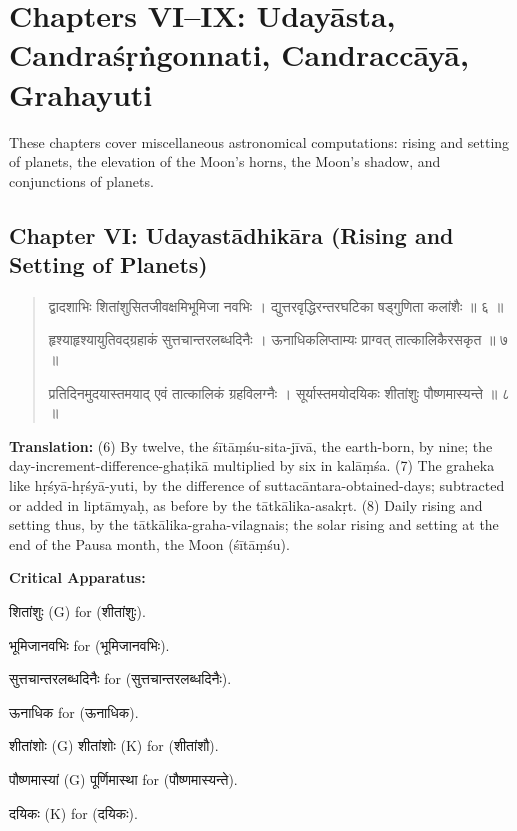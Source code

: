 \documentclass[11pt,a4paper]{article}
\newcommand{\dev}[1]{{\devanagarifont #1}}
\newenvironment{sanskritverse}{%
  \begin{quote}%
  \devanagarifont%
  \setlength{\leftmargin}{2em}%
}{\end{quote}}
\newenvironment{variants}{%
  \small%
  \color{varecolor}%
  \list{}{\leftmargin=2em\itemindent=-1em}%
}{\endlist}
\begin{document}
\newpage


\section*{Chapters VI--IX: Udayāsta, Candraśṛṅgonnati, Candraccāyā, Grahayuti}

These chapters cover miscellaneous astronomical computations: rising and setting 
of planets, the elevation of the Moon's horns, the Moon's shadow, and conjunctions 
of planets.

\subsection*{Chapter VI: Udayastādhikāra (Rising and Setting of Planets)}

\begin{sanskritverse}
\dev{द्वादशाभिः शितांशुसितजीवक्षमिभूमिजा नवभिः} ।
\dev{द्युत्तरवृद्धिरन्तरघटिका षड्गुणिता कलांशैः ॥ ६ ॥}

\dev{हृश्याहृश्यायुतिवद्ग्रहाकं सुत्तचान्तरलब्धदिनैः} ।
\dev{ऊनाधिकलिप्ताम्यः प्राग्वत् तात्कालिकैरसकृत ॥ ७ ॥}

\dev{प्रतिदिनमुदयास्तमयाद् एवं तात्कालिकं ग्रहविलग्नैः} ।
\dev{सूर्यास्तमयोदयिकः शीतांशुः पौष्णमास्यन्ते ॥ ८ ॥}
\end{sanskritverse}

\textbf{Translation:} (6) By twelve, the śītāṃśu-sita-jīvā, the earth-born, by 
nine; the day-increment-difference-ghaṭikā multiplied by six in kalāṃśa. (7) The 
graheka like hṛśyā-hṛśyā-yuti, by the difference of suttacāntara-obtained-days; 
subtracted or added in liptāmyaḥ, as before by the tātkālika-asakṛt. (8) Daily 
rising and setting thus, by the tātkālika-graha-vilagnais; the solar rising and 
setting at the end of the Pausa month, the Moon (śītāṃśu).

\textcolor{varecolor}{\textbf{Critical Apparatus:}}
\begin{variants}
\item[6.1] \dev{शितांशुः} (G) \dev{for} (\dev{शीतांशुः}).
\item[6.2] \dev{भूमिजानवभिः} \dev{for} (\dev{भूमिजानवभिः}).
\item[7.1] \dev{सुत्तचान्तरलब्धदिनैः} \dev{for} (\dev{सुत्तचान्तरलब्धदिनैः}).
\item[7.2] \dev{ऊनाधिक} \dev{for} (\dev{ऊनाधिक}).
\item[8.1] \dev{शीतांशोः} (G) \dev{शीतांशोः} (K) \dev{for} (\dev{शीतांशौ}).
\item[8.2] \dev{पौष्णमास्यां} (G) \dev{पूर्णिमास्था} \dev{for} (\dev{पौष्णमास्यन्ते}).
\item[8.3] \dev{दयिकः} (K) \dev{for} (\dev{दयिकः}).
\end{variants}
\end{document}
